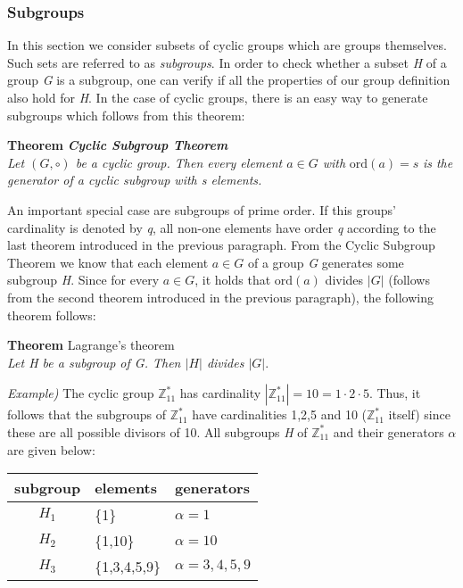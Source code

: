 \subsubsection{Subgroups}
In this section we consider subsets of cyclic groups which are groups themselves. Such sets are referred to as \textit{subgroups}. In order to check whether a subset \textit{H} of a group \textit{G} is a subgroup, one can verify if all the properties of our group definition also hold for \textit{H}. In the case of cyclic groups, there is an easy way to generate subgroups which follows from this theorem:
\begin{framed}
    \hfill\break\textbf{Theorem} \textit{\textbf{Cyclic Subgroup Theorem}}\\
    \textit{Let $(G,\circ)$ be a cyclic group. Then every element $a\in G$ with} $\text{ord}(a)=s$ \textit{is the generator of a cyclic subgroup with s elements.}
\end{framed}
\hfill\break
An important special case are subgroups of prime order. If this groups' cardinality is denoted by \textit{q}, all non-one elements have order \textit{q} according to the last theorem introduced in the previous paragraph. From the Cyclic Subgroup Theorem we know that each element $a\in G$ of a group \textit{G} generates some subgroup \textit{H}. Since for every $a\in G$, it holds that $\text{ord}(a)$ divides $|G|$ (follows from the second theorem introduced in the previous paragraph), the following theorem follows:
\begin{center}
    \begin{framed}
        \textbf{Theorem} Lagrange's theorem\\
        \textit{Let H be a subgroup of G. Then $|H|$ divides $|G|$}.
    \end{framed}
\end{center}
\textit{Example)} The cyclic group $\mathbb{Z}_{11}^*$ has cardinality $|\mathbb{Z}_{11}^*|=10=1\cdot2\cdot5$. Thus, it follows that the subgroups of $\mathbb{Z}_{11}^*$ have cardinalities 1,2,5 and 10 ($\mathbb{Z}_{11}^*$ itself) since these are all possible divisors of 10. All subgroups \textit{H} of $\mathbb{Z}_{11}^*$ and their generators $\alpha$ are given below:
\begin{center}
    \begin{tabular}{cll}
        subgroup&elements&generators\\
        \hline
        $H_1$&\{1\}&$\alpha=1$\\
        $H_2$&\{1,10\}&$\alpha=10$\\
        $H_3$&\{1,3,4,5,9\}&$\alpha=3,4,5,9$
    \end{tabular}
\end{center}
